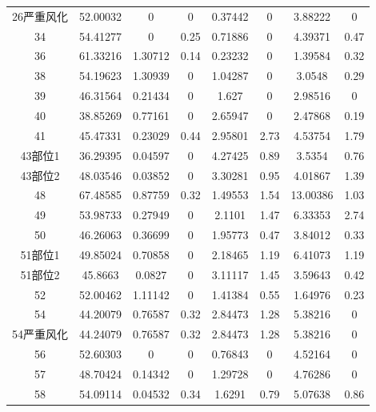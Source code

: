 \documentclass[withoutpreface,bwprint]{cumcmthesis} %
\begin{document}
\begin{appendices}
\begin{table}[H]
\begin{tabular}{cccccccc}
    26严重风化 & 52.00032 & 0       & 0        & 0.37442  & 0        & 3.88222  & 0        \\
    34     & 54.41277 & 0       & 0.25     & 0.71886  & 0        & 4.39371  & 0.47     \\
    36     & 61.33216 & 1.30712 & 0.14     & 0.23232  & 0        & 1.39584  & 0.32     \\
    38     & 54.19623 & 1.30939 & 0        & 1.04287  & 0        & 3.0548   & 0.29     \\
    39     & 46.31564 & 0.21434 & 0        & 1.627    & 0        & 2.98516  & 0        \\
    40     & 38.85269 & 0.77161 & 0        & 2.65947  & 0        & 2.47868  & 0.19     \\
    41     & 45.47331 & 0.23029 & 0.44     & 2.95801  & 2.73     & 4.53754  & 1.79     \\
    43部位1  & 36.29395 & 0.04597 & 0        & 4.27425  & 0.89     & 3.5354   & 0.76     \\
    43部位2  & 48.03546 & 0.03852 & 0        & 3.30281  & 0.95     & 4.01867  & 1.39     \\
    48     & 67.48585 & 0.87759 & 0.32     & 1.49553  & 1.54     & 13.00386 & 1.03     \\
    49     & 53.98733 & 0.27949 & 0        & 2.1101   & 1.47     & 6.33353  & 2.74     \\
    50     & 46.26063 & 0.36699 & 0        & 1.95773  & 0.47     & 3.84012  & 0.33     \\
    51部位1  & 49.85024 & 0.70858 & 0        & 2.18465  & 1.19     & 6.41073  & 1.19     \\
    51部位2  & 45.8663  & 0.0827  & 0        & 3.11117  & 1.45     & 3.59643  & 0.42     \\
    52     & 52.00462 & 1.11142 & 0        & 1.41384  & 0.55     & 1.64976  & 0.23     \\
    54     & 44.20079 & 0.76587 & 0.32     & 2.84473  & 1.28     & 5.38216  & 0        \\
    54严重风化 & 44.24079 & 0.76587 & 0.32     & 2.84473  & 1.28     & 5.38216  & 0        \\
    56     & 52.60303 & 0       & 0        & 0.76843  & 0        & 4.52164  & 0        \\
    57     & 48.70424 & 0.14342 & 0        & 1.29728  & 0        & 4.76286  & 0        \\
    58     & 54.09114 & 0.04532 & 0.34     & 1.6291   & 0.79     & 5.07638  & 0.86     \\ \bottomrule[1.5pt]
  \end{tabular}
\end{table}


\end{appendices}
\end{document}
